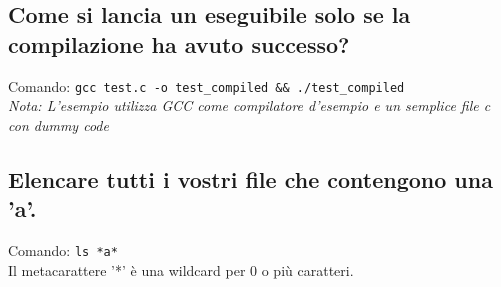 \documentclass{article}
\begin{document}
\subsection{Come si lancia un eseguibile solo se la compilazione ha avuto successo?}
Comando: \texttt{gcc test.c -o test\_compiled \&\& ./test\_compiled}\\
\textit{Nota: L'esempio utilizza GCC come compilatore d'esempio e un semplice file c con dummy code}

\subsection{Elencare tutti i vostri file che contengono una 'a'.}
Comando: \texttt{ls *a*}\\
Il metacarattere '*' è una wildcard per 0 o più caratteri.
\end{document}
